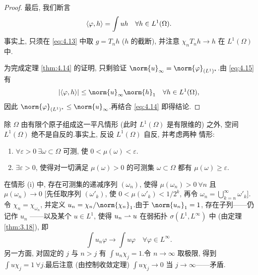 \begin{proof}
最后, 我们断言
\begin{equation}
\left\langle \varphi,h\right\rangle=\int uh\quad\forall h\in L^1(\Omega).
\label{eq:4.15}
\end{equation}
事实上, 只须在 \eqref{eq:4.13} 中取 $g=T_nh$ ($h$ 的截断), 并注意
$\chi_nT_nh\to h$ 在 $L^1(\Omega)$ 中.

为完成定理  \ref{thm:4.14} 的证明, 只剩验证
$\norm{u}_\infty=\norm{\varphi}_{(L^1)^\star}$.由 \eqref{eq:4.15} 有
\begin{equation*}
\abs{\dual{\varphi}{h}}\le\norm{u}_\infty\norm{h}_1\quad\forall h\in L^1(\Omega),
\end{equation*}
因此 $\norm{\varphi}_{(L^1)^\star}\le\norm{u}_\infty$.再结合 \eqref{eq:4.14}
即得结论.
\end{proof}

\begin{keyremark}
\label{rem:4.6}
除 $\Omega$ 由有限个原子组成这一平凡情形 (此时 $L^1(\Omega)$ 是有限维的) 之外,
空间 $L^1(\Omega)$ 绝不是自反的.事实上, 反设 $L^1(\Omega)$ 自反, 并考虑两种
情形:
\begin{enumerate}[label=(\roman*), leftmargin=2.4em, itemsep=0.1em]
	\item $\forall\varepsilon>0\ \exists\omega\subset\Omega$ 可测, 使
	      $0<\mu(\omega)<\varepsilon$.
	\item $\exists\varepsilon>0$, 使得对一切满足 $\mu(\omega)>0$ 的可测集
	      $\omega\subset\Omega$ 都有 $\mu(\omega)\ge\varepsilon$.
\end{enumerate}
在情形 (i) 中, 存在可测集的递减序列 $(\omega_n)$, 使得
$\mu(\omega_n)>0\ \forall n$ 且 $\mu(\omega_n)\to0$ [先任取序列
$(\omega'_k)$, 使 $0<\mu(\omega'_k)<1/2^k$, 再令
$\omega_n=\bigcup_{k=n}^\infty\omega'_k$].令 $\chi_n=\chi_{\omega_n}$, 并定义
$u_n=\chi_n/\norm{\chi_n}_1$.由于 $\norm{u_n}_1=1$, 存在子列——仍记作 $u_n$
——以及某个 $u\in L^1$, 使得 $u_n\rightharpoonup u$ 在弱拓扑 $\sigma(L^1,L^\infty)$ 中
(由定理  \ref{thm:3.18}), 即
\begin{equation}
\int u_n\varphi\to\int u\varphi\quad\forall\varphi\in L^\infty.
\label{eq:4.16}
\end{equation}
另一方面, 对固定的 $j$ 与 $n>j$ 有 $\int u_n\chi_j=1$.令 $n\to\infty$ 取极限,
得到 $\int u\chi_j=1\ \forall j$.最后注意 (由控制收敛定理)
$\int u\chi_j\to0$ 当 $j\to\infty$——矛盾.


\end{keyremark}
